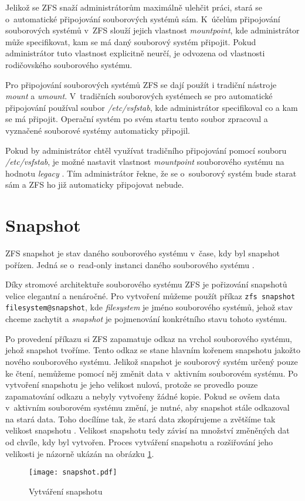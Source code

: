 Jelikož se ZFS snaží administrátorům maximálně ulehčit práci, stará se o~automatické připojování souborových systémů sám. K~účelům připojování souborových systémů v~ZFS slouží jejich vlastnost \emph{mountpoint}, kde administrátor může specifikovat, kam se má daný souborový systém připojit. Pokud administrátor tuto vlastnost explicitně neurčí, je odvozena od vlastnosti rodičovského souborového systému.

Pro připojování souborových systémů ZFS se dají použít i tradiční nástroje \emph{mount} a \emph{umount}. V~tradičních souborových systémech se pro automatické připojování používal soubor \emph{/etc/vsfstab}, kde administrátor specifikoval co a kam se má připojit. Operační systém po svém startu tento soubor zpracoval a vyznačené souborové systémy automaticky připojil.

Pokud by administrátor chtěl využívat tradičního připojování pomocí souboru \emph{/etc/vsfstab}, je možné nastavit vlastnost \emph{mountpoint} souborového systému na hodnotu \emph{legacy} \cite{mountpoint}. Tím administrátor řekne, že se o~souborový systém bude starat sám a ZFS ho již automaticky připojovat nebude.
\section{Snapshot}
\label{snapshot}
ZFS snapshot je stav daného souborového systému v~čase, kdy byl snapshot pořízen. Jedná se o~read-only instanci daného souborového systému \cite{snapshot}.

Díky stromové architektuře souborového systému ZFS je pořizování snapshotů velice elegantní a nenáročné. Pro vytvoření můžeme použít příkaz \verb|zfs snapshot filesystem@snapshot|, kde \emph{filesystem} je jméno souborového systémů, jehož stav chceme zachytit a \emph{snapshot} je pojmenování konkrétního stavu tohoto systému.

Po provedení příkazu si ZFS zapamatuje odkaz na vrchol souborového systému, jehož snapshot tvoříme. Tento odkaz se stane hlavním kořenem snapshotu jakožto nového souborového systému. Jelikož snapshot je souborový systém určený pouze ke čtení, nemůžeme pomocí něj změnit data v~aktivním souborovém systému. Po vytvoření snapshotu je jeho velikost nulová, protože se provedlo pouze zapamatování odkazu a nebyly vytvořeny žádné kopie. Pokud se ovšem data v~aktivním souborovém systému změní, je nutné, aby snapshot stále odkazoval na stará data. Toho docílíme tak, že stará data zkopírujeme a zvětšíme tak velikost snapshotu \cite{snapshot}. Velikost snapshotu tedy závisí na množství změněných dat od chvíle, kdy byl vytvořen. Proces vytváření snapshotu a rozšiřování jeho velikosti je názorně ukázán na obrázku \ref{snapshotproces}.
\begin{figure}
    \centering
    \texttt{[image: snapshot.pdf]}
    \caption{Vytváření snapshotu}
    \label{snapshotproces}
\end{figure}

